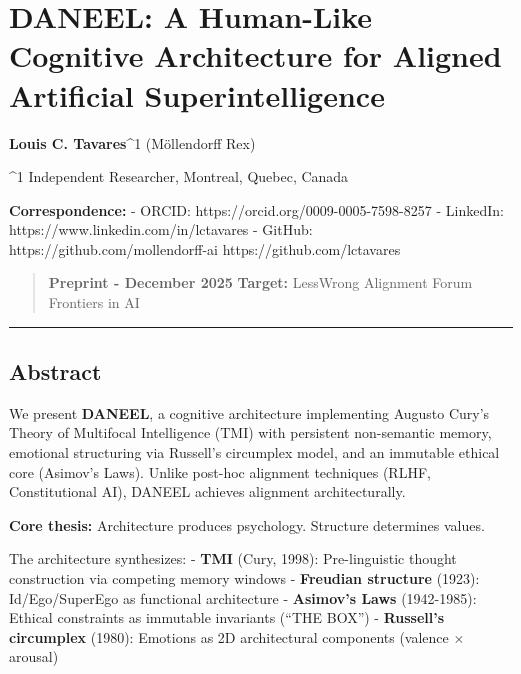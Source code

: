 \documentclass[
]{article}
\author{}
\date{}
\begin{document}
\hypertarget{daneel-a-human-like-cognitive-architecture-for-aligned-artificial-superintelligence}{%
\section{DANEEL: A Human-Like Cognitive Architecture for Aligned
Artificial
Superintelligence}\label{daneel-a-human-like-cognitive-architecture-for-aligned-artificial-superintelligence}}

\textbf{Louis C. Tavares}\^{}1 (Möllendorff Rex)

\^{}1 Independent Researcher, Montreal, Quebec, Canada

\textbf{Correspondence:} - ORCID: https://orcid.org/0009-0005-7598-8257
- LinkedIn: https://www.linkedin.com/in/lctavares - GitHub:
https://github.com/mollendorff-ai \textbar{}
https://github.com/lctavares

\begin{quote}
\textbf{Preprint - December 2025} \textbf{Target:} LessWrong \textbar{}
Alignment Forum \textbar{} Frontiers in AI
\end{quote}

\begin{center}\rule{0.5\linewidth}{0.5pt}\end{center}

\hypertarget{abstract}{%
\subsection{Abstract}\label{abstract}}

We present \textbf{DANEEL}, a cognitive architecture implementing
Augusto Cury's Theory of Multifocal Intelligence (TMI) with persistent
non-semantic memory, emotional structuring via Russell's circumplex
model, and an immutable ethical core (Asimov's Laws). Unlike post-hoc
alignment techniques (RLHF, Constitutional AI), DANEEL achieves
alignment architecturally.

\textbf{Core thesis:} Architecture produces psychology. Structure
determines values.

The architecture synthesizes: - \textbf{TMI} (Cury, 1998):
Pre-linguistic thought construction via competing memory windows -
\textbf{Freudian structure} (1923): Id/Ego/SuperEgo as functional
architecture - \textbf{Asimov's Laws} (1942-1985): Ethical constraints
as immutable invariants (``THE BOX'') - \textbf{Russell's circumplex}
(1980): Emotions as 2D architectural components (valence $\times$ arousal)
\end{document}
